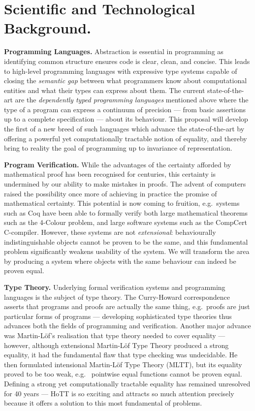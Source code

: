 \documentclass[a4paper,11pt]{article}
\newcommand{\eg}{{e.g.}\ }
\begin{document}
\vspace*{-0.1in} 
\section{Scientific and Technological Background.}
\vspace*{-0.1in} 

{\bf Programming Languages.} Abstraction is essential in programming
as identifying common structure ensures code is clear,
clean, and concise. This leads to high-level
programming languages with expressive type systems capable of closing
the {\em semantic gap} between what programmers know about
computational entities and what their types can express about them.
The current state-of-the-art are the {\em dependently typed
  programming languages} mentioned above where
the type of a program can express a
continuum of precision --- from basic assertions up to a complete
specification --- about its behaviour. This proposal will
develop the first of a new breed of 
such languages which advance the state-of-the-art by offering a
powerful yet computationally tractable notion of equality, and thereby bring to
reality the goal of programming up to invariance of representation.



{\bf Program Verification.} While the advantages of the certainty
afforded by mathematical proof has been recognised for centuries, this
certainty is undermined by our ability to make mistakes in
proofs. The advent of computers raised the possibility once more of
achieving in practice the promise of mathematical certainty. This
potential is now coming to fruition, \eg systems such as Coq have been
able to formally verify both large mathematical theorems such as the
4-Colour problem, and large software systems such as the CompCert
C-compiler. However, these systems are not {\em extensional}:
behaviourally indistinguishable objects cannot be proven to be the
same, and this fundamental problem significantly weakens usability of the
system. We will transform the area by producing a system where
objects with the same behaviour can indeed be proven equal.


{\bf Type Theory.} Underlying formal verification systems and
programming languages is the subject of type theory. The
Curry-Howard correspondence asserts that programs and proofs are
actually the same thing, \eg proofs are just particular forms of
programs --- developing sophisticated type theories thus advances both 
the fields of programming and verification. Another
major advance was Martin-L\"of's realisation that type theory needed
to cover equality --- however, although 
extensional Martin-L\"of Type Theory produced
a strong equality, it had the fundamental flaw that type
checking was undecidable. He then formulated intensional Martin-L\"of
Type Theory (MLTT), but its equality proved to be too weak, \eg
pointwise equal functions cannot be proven equal. Defining a strong yet
computationally tractable equality has remained unresolved for 40
years --- HoTT is so exciting and attracts so much attention precisely because it offers a
solution to this most fundamental of problems.
\end{document}
